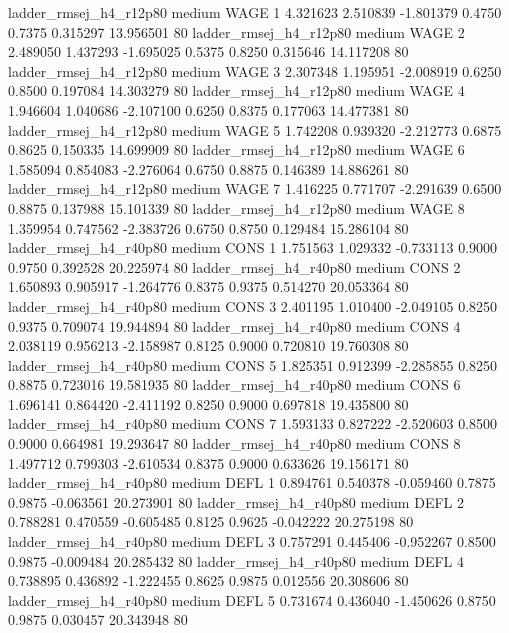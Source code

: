 ladder_rmsej_h4_r12p80     medium     WAGE                 1  4.321623 2.510839 -1.801379 0.4750 0.7375  0.315297   13.956501 80
ladder_rmsej_h4_r12p80     medium     WAGE                 2  2.489050 1.437293 -1.695025 0.5375 0.8250  0.315646   14.117208 80
ladder_rmsej_h4_r12p80     medium     WAGE                 3  2.307348 1.195951 -2.008919 0.6250 0.8500  0.197084   14.303279 80
ladder_rmsej_h4_r12p80     medium     WAGE                 4  1.946604 1.040686 -2.107100 0.6250 0.8375  0.177063   14.477381 80
ladder_rmsej_h4_r12p80     medium     WAGE                 5  1.742208 0.939320 -2.212773 0.6875 0.8625  0.150335   14.699909 80
ladder_rmsej_h4_r12p80     medium     WAGE                 6  1.585094 0.854083 -2.276064 0.6750 0.8875  0.146389   14.886261 80
ladder_rmsej_h4_r12p80     medium     WAGE                 7  1.416225 0.771707 -2.291639 0.6500 0.8875  0.137988   15.101339 80
ladder_rmsej_h4_r12p80     medium     WAGE                 8  1.359954 0.747562 -2.383726 0.6750 0.8750  0.129484   15.286104 80
ladder_rmsej_h4_r40p80     medium     CONS                 1  1.751563 1.029332 -0.733113 0.9000 0.9750  0.392528   20.225974 80
ladder_rmsej_h4_r40p80     medium     CONS                 2  1.650893 0.905917 -1.264776 0.8375 0.9375  0.514270   20.053364 80
ladder_rmsej_h4_r40p80     medium     CONS                 3  2.401195 1.010400 -2.049105 0.8250 0.9375  0.709074   19.944894 80
ladder_rmsej_h4_r40p80     medium     CONS                 4  2.038119 0.956213 -2.158987 0.8125 0.9000  0.720810   19.760308 80
ladder_rmsej_h4_r40p80     medium     CONS                 5  1.825351 0.912399 -2.285855 0.8250 0.8875  0.723016   19.581935 80
ladder_rmsej_h4_r40p80     medium     CONS                 6  1.696141 0.864420 -2.411192 0.8250 0.9000  0.697818   19.435800 80
ladder_rmsej_h4_r40p80     medium     CONS                 7  1.593133 0.827222 -2.520603 0.8500 0.9000  0.664981   19.293647 80
ladder_rmsej_h4_r40p80     medium     CONS                 8  1.497712 0.799303 -2.610534 0.8375 0.9000  0.633626   19.156171 80
ladder_rmsej_h4_r40p80     medium     DEFL                 1  0.894761 0.540378 -0.059460 0.7875 0.9875 -0.063561   20.273901 80
ladder_rmsej_h4_r40p80     medium     DEFL                 2  0.788281 0.470559 -0.605485 0.8125 0.9625 -0.042222   20.275198 80
ladder_rmsej_h4_r40p80     medium     DEFL                 3  0.757291 0.445406 -0.952267 0.8500 0.9875 -0.009484   20.285432 80
ladder_rmsej_h4_r40p80     medium     DEFL                 4  0.738895 0.436892 -1.222455 0.8625 0.9875  0.012556   20.308606 80
ladder_rmsej_h4_r40p80     medium     DEFL                 5  0.731674 0.436040 -1.450626 0.8750 0.9875  0.030457   20.343948 80
